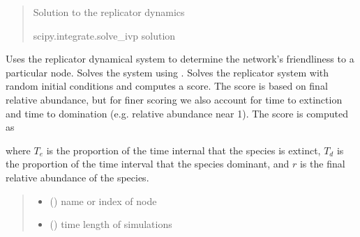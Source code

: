 \documentclass[letterpaper,10pt,english]{sphinxmanual}
\begin{document}
\begin{fulllineitems}
\begin{fulllineitems}
\begin{quote}
\begin{description}
\sphinxAtStartPar
Solution to the replicator dynamics

\sphinxAtStartPar
scipy.integrate.solve\_ivp solution

\end{description}\end{quote}

\end{fulllineitems}


\begin{fulllineitems}
\label{\detokenize{friendlynets:friendlyNet.friendlyNet.replicator_score_single}}
\pysigstartsignatures
{}
\pysigstopsignatures
\sphinxAtStartPar
Uses the replicator dynamical system to determine the network’s friendliness to a particular node. Solves the system using {\hyperref[\detokenize{friendlynets:friendlyNet.friendlyNet.solve_replicator}]{}}.
Solves the replicator system with random initial conditions and computes a score. The score is based on final relative abundance, but for finer scoring we also account for time to extinction
and time to domination (e.g. relative abundance near 1). The score is computed as

\sphinxAtStartPar
where \(T_e\) is the proportion of the time internal that the species is  extinct, \(T_d\) is the proportion of the time interval that the species  dominant, and \(r\) is the final relative abundance of the species.
\begin{quote}\begin{description}
\begin{itemize}
\item {} 
\sphinxAtStartPar
{} () \textendash{} name or index of node

\item {} 
\sphinxAtStartPar
{} () \textendash{} time length of simulations


\end{itemize}
\end{description}
\end{quote}
\end{fulllineitems}
\end{fulllineitems}
\end{document}
